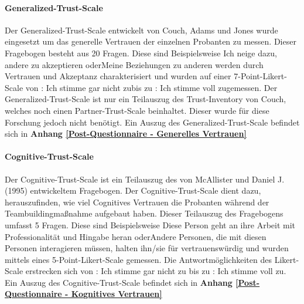 \documentclass[a4paper,11pt]{article}%
\renewcommand{\\}{\vspace*{0.5\baselineskip} \newline}
\begin{document}
			\paragraph{Generalized-Trust-Scale}
Der Generalized-Trust-Scale entwickelt von Couch, Adams und Jones \citep{couch1996assessment} wurde eingesetzt um das generelle Vertrauen der einzelnen Probanten zu messen.
Dieser Fragebogen besteht aus 20 Fragen. Diese sind Beispielsweise \flqq Ich neige dazu, andere zu akzeptieren \frqq oder\flqq Meine Beziehungen zu anderen werden durch Vertrauen und Akzeptanz charakterisiert \frqq und wurden auf einer 7-Point-Likert-Scale von : Ich stimme gar nicht zu\frqq bis zu  : Ich stimme voll zu\frqq gemessen. Der Generalized-Trust-Scale ist nur ein Teilauszug des \flqq Trust-Inventory von Couch\frqq, welches noch einen \flqq Partner-Trust-Scale \frqq beinhaltet. Dieser wurde für diese Forschung jedoch nicht benötigt. 
\\Ein Auszug des Generalized-Trust-Scale befindet sich in \textbf{Anhang \ref{Post-Questionnaire - Generelles Vertrauen}}

%			

			\paragraph{Cognitive-Trust-Scale}
Der Cognitive-Trust-Scale ist ein Teilauszug des von McAllister und Daniel J. (1995) \citep[p.37]{mcallister1995affect} entwickeltem Fragebogen. Der Cognitive-Trust-Scale dient dazu, herauszufinden, wie viel Cognitives Vertrauen die Probanten während der Teambuildingmaßnahme aufgebaut haben. Dieser Teilauszug des Fragebogens umfasst 5 Fragen. Diese sind Beispielsweise \flqq Diese Person geht an ihre Arbeit mit Professionalität und Hingabe heran \frqq oder\flqq Andere Personen, die mit diesen Personen interagieren müssen, halten ihn/sie für vertrauenswürdig und wurden mittels eines 5-Point-Likert-Scale gemessen. Die Antwortmöglichkeiten des Likert-Scale erstrecken sich von : Ich stimme gar nicht zu \frqq bis zu : Ich stimme voll zu. 
\\Ein Auszug des Cognitive-Trust-Scale befindet sich in \textbf{Anhang \ref{Post-Questionnaire - Kognitives Vertrauen}}
\end{document}
